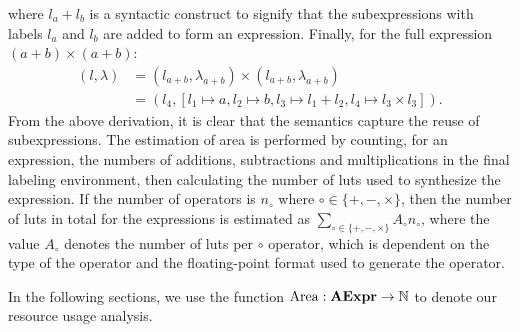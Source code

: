 where $l_a + l_b$ is a syntactic construct to signify that the subexpressions
with labels $l_a$ and $l_b$ are added to form an expression.
Finally, for the full expression $(a + b) \times (a + b)$:
\begin{equation}
    \begin{aligned}
        (l, \lambda)
            &= (l_{a + b}, \lambda_{a + b}) \times
               (l_{a + b}, \lambda_{a + b}) \\
            &= (l_4, [l_1\mapsto{a}, l_2\mapsto{b},
                      l_3\mapsto{l_1 + l_2}, l_4\mapsto{l_3 \times l_3}]).
    \end{aligned}
\end{equation}
From the above derivation, it is clear that the semantics capture the reuse
of subexpressions. The estimation of area is performed by counting, for an
expression, the numbers of additions, subtractions and multiplications in the
final labeling environment, then calculating the number of \glspl{lut} used
to synthesize the expression. If the number of operators is $n_\circ$ where
$\circ\in\{+,-,\times\}$, then the number of \glspl{lut} in total for the
expressions is estimated as $\sum_{\circ\in\{+,-,\times\}} A_\circ n_\circ$,
where the value $A_\circ$ denotes the number of \glspl{lut} per $\circ$
operator, which is dependent on the type of the operator and the floating-point
format used to generate the operator.

In the following sections, we use the function $\operatorname{\mathrm{Area}}: \mathbf{AExpr}\to\mathbb{N}$
to denote our resource usage analysis.
